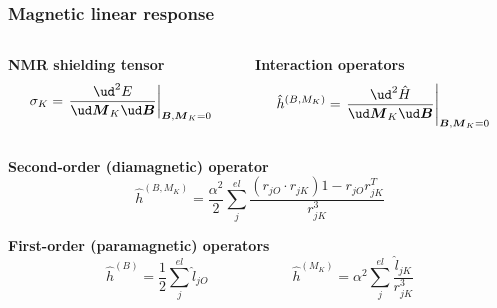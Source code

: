 \begin{frame}
\frametitle{Magnetic linear response}

\begin{columns}
\begin{column}[b]{0.48\linewidth}
    \centering
    \textbf{NMR shielding tensor}
    \begin{equation}
        \nonumber
        \sigma_K = \left. \frac{\ud^2 E}{\ud \boldsymbol{M}_K \ud
        \boldsymbol{B}}\right|_{\boldsymbol{B},\boldsymbol{M}_K=0}
    \end{equation}
\end{column}

\begin{column}[b]{0.48\linewidth}
    \centering
    \textbf{Interaction operators}
    \begin{equation}
        \nonumber
        \hat{h}^{(B,M_K)} = 
        \left. \frac{\ud^2 \hat{H}}{\ud \boldsymbol{M}_K \ud
        \boldsymbol{B}}\right|_{\boldsymbol{B},\boldsymbol{M}_K=0}
    \end{equation}
\end{column}

\end{columns}

\vspace{10mm}

\pause
\centering
\textbf{Second-order (diamagnetic) operator}
\begin{equation}
    \nonumber
    \hat{h}^{(B,M_K)} = \frac{\alpha^2}{2} 
    \sum_j^{el} \frac{\left(r_{jO}\cdot r_{jK}\right)1 -
    r_{jO}r_{jK}^T}{r_{jK}^3}
\end{equation}

\vspace{5mm}

\pause
\textbf{First-order (paramagnetic) operators}
\begin{equation}
    \nonumber
    \hat{h}^{(B)} = \frac{1}{2}\sum_j^{el} \hat{l}_{jO} \qquad \qquad \qquad
    \hat{h}^{(M_K)} = \alpha^2 \sum_j^{el} \frac{\hat{l}_{jK}}{r_{jK}^3}
\end{equation}

\end{frame}

